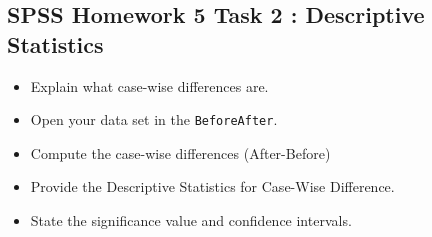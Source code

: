 \documentclass[a4paper,12pt]{article}
\begin{document}
\subsection*{SPSS Homework 5  Task 2 : Descriptive Statistics }

\begin{itemize}
\item Explain what case-wise differences are.
\item Open your data set in the \texttt{BeforeAfter}.
\item Compute the case-wise differences (After-Before)
\item Provide the Descriptive Statistics for Case-Wise Difference.
\item State the significance value and confidence intervals.
\end{itemize}
\end{document}
